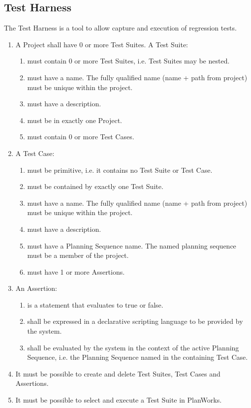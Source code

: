 \documentclass[twoside, 11pt]{article}
\begin{document}
\subsection{Test Harness}
The Test Harness is a tool to allow capture and execution of regression tests.
\begin{enumerate}
\item A Project shall have 0 or more Test Suites. A Test Suite:
\begin{enumerate}
\item must contain 0 or more Test Suites, i.e. Test Suites may be nested.
\item must have a name. The fully qualified name (name + path from project) must be unique within the project.
\item must have a description.
\item must be in exactly one Project.
\item must contain 0 or more Test Cases.
\end{enumerate}
\item A Test Case:
\begin{enumerate}
\item must be primitive, i.e. it contains no Test Suite or Test Case.
\item must be contained by exactly one Test Suite.
\item must have a name. The fully qualified name (name + path from project) must be unique within the project.
\item must have a description.
\item must have a Planning Sequence name. The named planning sequence must be a member of the project.
\item must have 1 or more Assertions.
\end{enumerate}
\item An Assertion:
\begin{enumerate}
\item is a statement that evaluates to true or false.
\item shall be expressed in a declarative scripting language to be provided by the system.
\item shall be evaluated by the system in the context of the active Planning Sequence, i.e. the Planning Sequence named in the containing Test Case. 
\end{enumerate}
\item It must be possible to create and delete Test Suites, Test Cases and Assertions.
\item It must be possible to select and execute a Test Suite in PlanWorks.

\end{enumerate}
\end{document}
